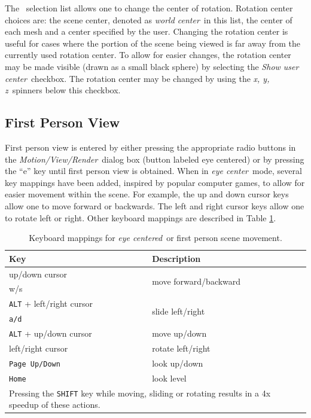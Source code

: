 \documentclass[11pt,twoside]{book}
\newcommand{\frameit}[1]{\fbox{\tt #1}}
\begin{document}
The \frameit{Rotate about}\ selection list allows one to change the center of rotation.
Rotation center choices are: the scene center, denoted as {\em world center}\ in this list, the center of each mesh and a center specified by the user.
Changing the rotation center is useful for cases where the portion of the scene being viewed is far away from the currently used rotation center.
To allow for easier changes, the rotation center may be made visible (drawn as a small black sphere) by selecting the {\em Show user center}\ checkbox.  The rotation center may be changed by using the
{\em x, y, z}\ spinners below this checkbox.

\subsection{First Person View}
\label{section:eyeview}
First person view is entered by either pressing the appropriate
radio buttons in the {\em Motion/View/Render}\ dialog box (button
labeled eye centered) or by pressing the ``e'' key until first
person view is obtained. When in {\em eye center}\ mode, several
key mappings have been added, inspired by popular computer games,
to allow for easier movement within the scene. For example, the up
and down cursor keys allow one to move forward or backwards.  The
left and right cursor keys allow one to rotate left or right.
Other keyboard mappings are described in Table \ref{tabKEYS}.

\begin{table}[\figoptions]
\begin{center}
\caption{Keyboard mappings for {\em eye centered}\ or first person scene movement.}
\vspace{0.1in}
\begin{tabular}{|l|l|}
\hline Key &   Description  \\

\hline\hline
up/down cursor & \multirow{2}{*}{move forward/backward}  \\
w/s &   \\\hline
{\tt ALT} + left/right cursor  & \multirow{2}{*}{slide left/right} \\
{\tt a/d}  &  \\ \hline
{\tt ALT} + up/down cursor  & move up/down  \\ \hline\hline
left/right cursor  & rotate left/right \\ \hline
{\tt Page Up/Down}  & look up/down \\ \hline
{\tt Home}  & look level \\ \hline\hline
\multicolumn{2}{|p{3.5in}|}{Pressing the {\tt SHIFT} key while moving, sliding or rotating
results in a  4x speedup of these actions. } \\ \hline

\end{tabular}
\label{tabKEYS}
\end{center}
\end{table}
\end{document}
